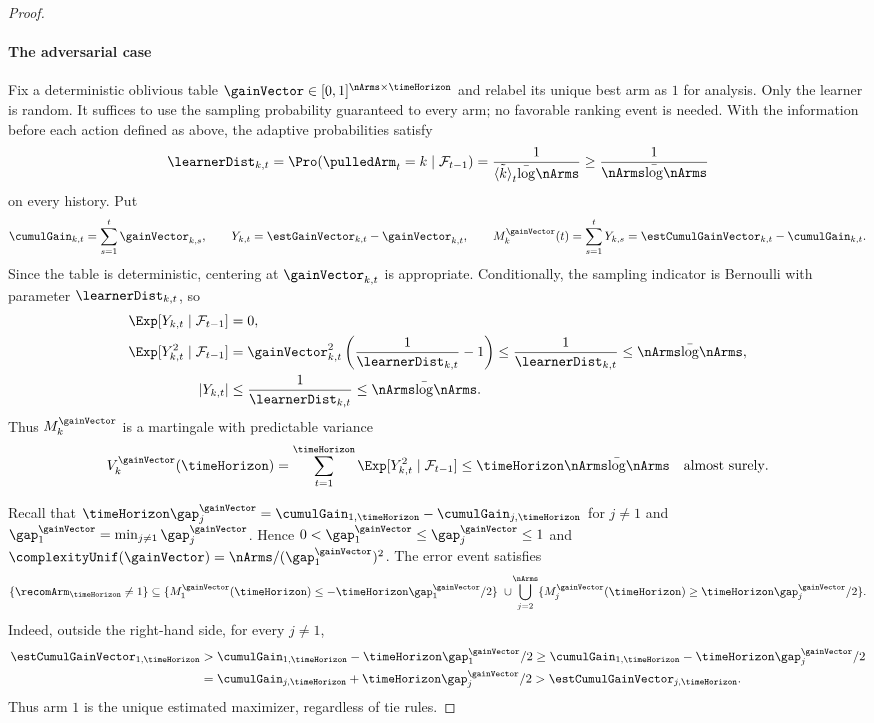 \begin{proof}
	\paragraph{The adversarial case}
Fix a deterministic oblivious table
$\gainVector\in[0,1]^{\nArms\times\timeHorizon}$ and relabel its
unique best arm as $1$ for analysis. Only the learner is random.
It suffices to use the sampling probability guaranteed to every arm;
no favorable ranking event is needed. With the information before
each action defined as above, the adaptive probabilities satisfy
\[
\learnerDist_{k,t}
=\Pro(\pulledArm_t=k\mid\mathcal F_{t-1})
=\frac1{\tilde{\langle k\rangle}_t\bar\log\nArms}
\geq\frac1{\nArms\bar\log\nArms}
\]
on every history. Put
\[
\cumulGain_{k,t}=\sum_{s=1}^t\gainVector_{k,s},\qquad
Y_{k,t}=\estGainVector_{k,t}-\gainVector_{k,t},\qquad
M_k^{\gainVector}(t)=\sum_{s=1}^tY_{k,s}
=\estCumulGainVector_{k,t}-\cumulGain_{k,t}.
\]
Since the table is deterministic, centering at $\gainVector_{k,t}$
is appropriate. Conditionally, the sampling indicator is Bernoulli
with parameter $\learnerDist_{k,t}$, so
\begin{align*}
\Exp[Y_{k,t}\mid\mathcal F_{t-1}]&=0,\\
\Exp[Y_{k,t}^2\mid\mathcal F_{t-1}]
&=\gainVector_{k,t}^2\left(\frac1{\learnerDist_{k,t}}-1\right)
\leq\frac1{\learnerDist_{k,t}}\leq\nArms\bar\log\nArms,\\
|Y_{k,t}|&\leq\frac1{\learnerDist_{k,t}}\leq\nArms\bar\log\nArms.
\end{align*}
Thus $M_k^{\gainVector}$ is a martingale with predictable variance
\[
V_k^{\gainVector}(\timeHorizon)
=\sum_{t=1}^{\timeHorizon}\Exp[Y_{k,t}^2\mid\mathcal F_{t-1}]
\leq\timeHorizon\nArms\bar\log\nArms
\quad\text{almost surely}.
\]

Recall that
$\timeHorizon\gap_j^{\gainVector}
=\cumulGain_{1,\timeHorizon}-\cumulGain_{j,\timeHorizon}$ for $j\neq1$
and $\gap_1^{\gainVector}=\min_{j\neq1}\gap_j^{\gainVector}$.
Hence $0<\gap_1^{\gainVector}\leq\gap_j^{\gainVector}\leq1$ and
$\complexityUnif(\gainVector)=\nArms/(\gap_1^{\gainVector})^2$.
The error event satisfies
\[
\{\recomArm_{\timeHorizon}\neq1\}
\subseteq
\{M_1^{\gainVector}(\timeHorizon)\leq-\timeHorizon\gap_1^{\gainVector}/2\}
\ \cup\!
\bigcup_{j=2}^{\nArms}
\{M_j^{\gainVector}(\timeHorizon)\geq\timeHorizon\gap_j^{\gainVector}/2\}.
\]
Indeed, outside the right-hand side, for every $j\neq1$,
\begin{align*}
\estCumulGainVector_{1,\timeHorizon}
&>\cumulGain_{1,\timeHorizon}-\timeHorizon\gap_1^{\gainVector}/2
\geq\cumulGain_{1,\timeHorizon}-\timeHorizon\gap_j^{\gainVector}/2\\
&=\cumulGain_{j,\timeHorizon}+\timeHorizon\gap_j^{\gainVector}/2
>\estCumulGainVector_{j,\timeHorizon}.
\end{align*}
Thus arm $1$ is the unique estimated maximizer, regardless of tie rules.


\end{proof}

